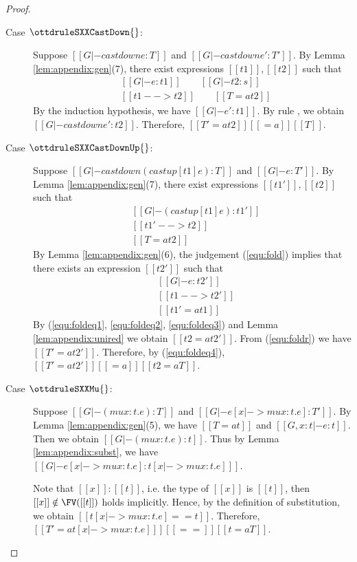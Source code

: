 \begin{proof}
\begin{description}
        \item[Case $\ottdruleSXXCastDown{}$:] $\quad$ \\
        Suppose $[[G |- castdown e :T]]$ and $[[G |- castdown e' :T']]$. By
Lemma \ref{lem:appendix:gen}(7), there exist expressions $[[t1]], [[t2]]$ such
that 
        \begin{align*}
            &[[G |- e:t1]] \qquad [[G |- t2:s]] \\
            &[[t1 --> t2]] \qquad [[T =a t2 ]]
        \end{align*}
        By the induction hypothesis, we have $[[G |- e':t1]]$. By rule
, we obtain $[[G |- castdown e' : t2 ]]$. Therefore, $[[T'
=a t2]] [[=a]] [[T]]$.
        
        \item[Case $\ottdruleSXXCastDownUp{}$:] $\quad$ \\
        Suppose $[[G |- castdown (castup [t1] e) :T]]$ and $[[G |- e :T']]$. By
Lemma \ref{lem:appendix:gen}(7), there exist expressions $[[t1']], [[t2]]$ such
that 
        \begin{align}
            &[[G |- (castup [t1] e):t1']] \label{equ:fold} \\
            &[[t1' --> t2]] \label{equ:foldeq1} \\
            &[[T =a t2 ]] \label{equ:foldeq4}
        \end{align}
        By Lemma \ref{lem:appendix:gen}(6), the judgement (\ref{equ:fold})
implies that there exists an expression $[[t2']]$ such that
        \begin{align}
            &[[G |- e:t2']] \label{equ:foldr} \\
            &[[t1 --> t2']] \label{equ:foldeq2} \\
            &[[t1' =a t1]] \label{equ:foldeq3}
        \end{align}
        By (\ref{equ:foldeq1}, \ref{equ:foldeq2}, \ref{equ:foldeq3}) and Lemma
\ref{lem:appendix:unired} we obtain $[[t2 =a t2']]$. From (\ref{equ:foldr}) we
have $[[T' =a t2' ]]$. Therefore, by (\ref{equ:foldeq4}), $[[T' =a t2' ]]
[[=a]] [[t2 =a T]]$.
        
        \item[Case $\ottdruleSXXMu{}$:] $\quad$ \\
        Suppose $[[G |- (mu x:t.e) :T]]$ and $[[G |- e[x |-> mu x:t.e] :T']]$.
By Lemma \ref{lem:appendix:gen}(5), we have $[[T =a t]]$ and $[[G, x:t |-
e:t]]$. Then we obtain $[[G |- (mu x:t.e) : t]]$. Thus by Lemma
\ref{lem:appendix:subst}, we have $[[G |- e[x |-> mu x:t.e] : t[x |-> mu x:t.e]
]]$.
        
        Note that $[[x]]:[[t]]$, i.e. the type of $[[x]]$ is $[[t]]$, then
$[[x]] \notin \FV([[t]])$ holds implicitly. Hence, by the definition of
substitution, we obtain $[[t[x |-> mu x:t.e] == t]]$. Therefore, $[[T' =a t[x
|-> mu x:t.e] ]] [[==]] [[t =a T]]$.
    \end{description}
\end{proof}

